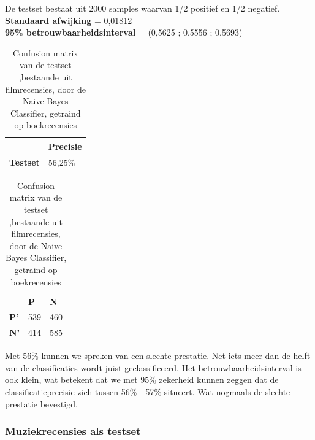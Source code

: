 De testset bestaat uit 2000 samples waarvan 1/2 positief en 1/2 negatief.\\

\textbf{Standaard afwijking} = 0,01812\\
\textbf{95\% betrouwbaarheidsinterval} = (0,5625 ; 0,5556 ; 0,5693)
 
\begin{table}[h]
\centering
\setlength\tabcolsep{4pt}
\begin{minipage}[t]{0.48\textwidth}
\centering
\begin{tabular}{l|l|}
\cline{2-2}
                                            & \textbf{Precisie} \\ \hline
\multicolumn{1}{|l|}{\textbf{Testset}}      & 56,25\%           \\ \hline
\end{tabular}
\caption{Classificatieprecisie Naive Bayes Classifier, getraind op boekrecensies, getest op filmrecensies}
\end{minipage}%
\hfill
\begin{minipage}[t]{0.48\textwidth}
\centering
\begin{tabular}{lll}
                                 & \textbf{P}               & \textbf{N}               \\ \cline{2-3} 
\multicolumn{1}{l|}{\textbf{P'}} & \multicolumn{1}{l|}{539} & \multicolumn{1}{l|}{460} \\ \cline{2-3} 
\multicolumn{1}{l|}{\textbf{N'}} & \multicolumn{1}{l|}{414} & \multicolumn{1}{l|}{585} \\ \cline{2-3} 
\end{tabular}
\caption{Confusion matrix van de testset ,bestaande uit filmrecensies, door de  Naive Bayes Classifier, getraind op boekrecensies} 
\end{minipage}
\end{table}

Met 56\% kunnen we spreken van een slechte prestatie. Net iets meer dan de helft van de classificaties wordt juist geclassificeerd. Het betrouwbaarheidsinterval is ook klein, wat betekent dat we met 95\% zekerheid kunnen zeggen dat de classificatieprecisie zich tussen 56\% - 57\% situeert. Wat nogmaals de slechte prestatie bevestigd.

\subsubsection{Muziekrecensies als testset}\label{Muziekrecensies als testset}

